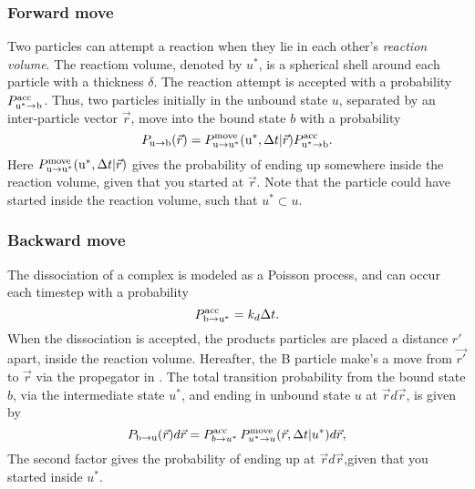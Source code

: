 \subsubsection{Forward move}
Two particles can attempt a reaction when they lie in each other's {\it reaction volume}. The reactiom volume, denoted by $u^*$, is a spherical shell around each particle with a thickness $\delta$. The reaction attempt is accepted with a probability $P^{\rm acc}_{{\rm u}^* \to {\rm b}}$. Thus, two particles initially in the unbound state $u$, separated by an inter-particle vector $\vec{r}$, move into the bound state $b$ with a probability
\begin{equation}
P_{ \rm{u} \to \rm{b} }(\vec{r}) = P^{\rm move}_{{\rm u} \to {\rm u}^*}({\rm u}^*,\Delta t|\vec{r}) P^{\rm acc}_{{\rm u}^* \to {\rm b}}.
\end{equation}
Here $P^{\rm move}_{{\rm u} \to {\rm u}^*}({\rm u}^*,\Delta t|\vec{r})$ gives the probability of ending up somewhere inside the reaction volume, given that you started at $\vec{r}$. Note that the particle could have started inside the reaction volume, such that $u^* \subset u$.

\subsubsection{Backward move}
The dissociation of a complex is modeled as a Poisson process, and can occur each timestep with a probability
\begin{equation}
 P^{\rm acc}_{\rm b \to u^*} = k_d \Delta t.
\end{equation}
When the dissociation is accepted, the products particles are placed a distance $r'$ apart, inside the reaction volume. Hereafter, the B particle make's a move from $\vec{r'}$ to $\vec{r}$ via the propegator in . The total transition probability from the bound state $b$, via the intermediate state $u^*$, and ending in unbound state $u$ at $\vec{r}d\vec{r}$, is given by
\begin{equation}
P_{ \rm{b} \to \rm{u}}(\vec{r})d\vec{r} =  P^{\rm acc}_{b \to u^*}\,P^{\rm move}_{u^* \to u}(\vec{r},\Delta t|u^*)d\vec{r},
\end{equation}
The second factor gives the probability of ending up at $\vec{r}d\vec{r}$,given that you started inside $u^*$.

